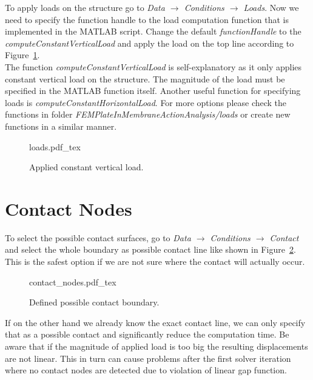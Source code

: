 \documentclass[10pt,a4paper]{article}
\begin{document}
To apply loads on the structure go to \textit{Data $\rightarrow$ Conditions $\rightarrow$ Loads}. Now we need to specify the function handle to the load computation function that is implemented in the MATLAB script. Change the default \textit{functionHandle} to the \textit{computeConstantVerticalLoad} and apply the load on the top line according to Figure~\ref{im:load}. \\

The function \textit{computeConstantVerticalLoad} is self-explanatory as it only applies constant vertical load on the structure. The magnitude of the load must be specified in the MATLAB function itself. Another useful function for specifying loads is \textit{computeConstantHorizontalLoad}. For more options please check the functions in folder \textit{FEMPlateInMembraneActionAnalysis/loads} or create new functions in a similar manner.

\begin{figure}[ht]
	\centering
	\footnotesize
    \def\svgwidth{0.9\textwidth}{loads.pdf_tex}
	\caption{Applied constant vertical load.}
	\label{im:load}
\end{figure}


\section{Contact Nodes}

To select the possible contact surfaces, go to \textit{Data $\rightarrow$ Conditions $\rightarrow$ Contact} and select the whole boundary as possible contact line like shown in Figure~\ref{im:contact_nodes}. This is the safest option if we are not sure where the contact will actually occur. \\

\begin{figure}[ht]
	\centering
	\footnotesize
    \def\svgwidth{0.9\textwidth}{contact_nodes.pdf_tex}
	\caption{Defined possible contact boundary.}
	\label{im:contact_nodes}
\end{figure}

If on the other hand we already know the exact contact line, we can only specify that as a possible contact and significantly reduce the computation time. Be aware that if the magnitude of applied load is too big the resulting displacements are not linear. This in turn can cause problems after the first solver iteration where no contact nodes are detected due to violation of linear gap function.
\end{document}
